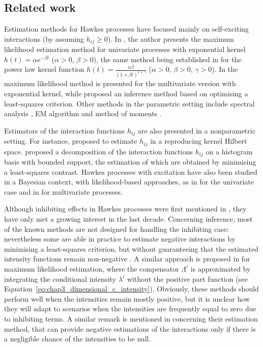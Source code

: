   \subsection{Related work}\label{sec:chap3_literature}
    Estimation methods for Hawkes processes have focused mainly on self-exciting interactions (by assuming $h_{ij} \geq 0$). In \textcite{Ozaki1979}, the author presents the maximum likelihood estimation method for univariate processes with exponential kernel \(h(t) = \alpha \mathrm{e}^{-\beta t}\) (\(\alpha>0\), \(\beta>0\)), the same method being established in \textcite{Mishra2016} for the power law kernel function \(h(t) = \frac{\alpha\beta} {(1 + \beta t)^{1 + \gamma}}\) (\(\alpha>0\), \(\beta>0\), \(\gamma > 0\)). In \textcite{Chen2018} the maximum likelihood method is presented for the multivariate version with exponential kernel, while \textcite{Bacry2020} proposed an inference method based on optimising a least-squares criterion. Other methods in the parametric setting include spectral analysis \parencite{Adamopoulos1976}, EM algorithm \parencite{Veen2008} and method of moments \parencite{DaFonseca2013}.

    Estimators of the interaction functions \(h_{ij}\) are also presented in a nonparametric setting. For instance, \textcite{Yang2017} proposed to estimate \(h_{ij}\) in a reproducing kernel Hilbert space.
    \textcite{Reynaud2014} proposed a decomposition of the interaction functions \(h_{ij}\) on a histogram basis with bounded support, the estimation of which are obtained by minimising a least-squares contrast.
    Hawkes processes with excitation have also been studied in a Bayesian context, with likelihood-based approaches, as in \textcite{Rasmussen2013} for the univariate case and in \textcite{Donnet2020} for multivariate processes.

    Although inhibiting effects in Hawkes processes were first mentioned in \textcite{Bremaud1996}, they have only met a growing interest in the last decade.
    Concerning inference, most of the known methods are not designed for handling the inhibiting case: nevertheless some are able in practice to estimate negative interactions by minimising a least-squares criterion, but without guaranteeing that the estimated intensity functions remain non-negative \parencite{Reynaud2014, Bacry2020}.
    A similar approach is proposed in \textcite{Lemonnier2014} for maximum likelihood estimation, where the compensator \(\Lambda^i\) is approximated by integrating
    the conditional intensity $\lambda^i$ without the positive part function (see Equation~\eqref{eq:chap3_dimensional_c_intensity}).
    Obviously, these methods should perform well when the intensities remain mostly positive, but it is unclear how they will adapt to scenarios when the intensities are frequently equal to zero due to inhibiting terms.
    A similar remark is mentioned in \textcite{Bacry2016} concerning their estimation method, that can provide negative estimations of the interactions only if there is a negligible chance of the intensities to be null.
    
